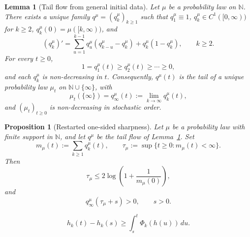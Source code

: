 \documentclass[10pt,a4paper]{amsart}
\newtheorem{lemma}{Lemma}
\newtheorem{proposition}{Proposition}
\newcommand{\N}{\mathbb N}
\begin{document}
\begin{lemma}[Tail flow from general initial data]
\label{lem:tail-flow-general-data}
Let $\mu$ be a probability law on $\N$. There exists a unique family
$q^\mu=(q_k^\mu)_{k\geq1}$ such that $q_1^\mu\equiv1$,
$q_k^\mu\in C^1([0,\infty))$ for $k\geq2$,
$q_k^\mu(0)=\mu([k,\infty))$, and
\begin{equation}
\label{eq:general-tail-flow}
        (q_k^\mu)'
        =
        \sum_{u=1}^{k-1}q_u^\mu
        (q_{k-u}^\mu-q_k^\mu)
        +q_k^\mu(1-q_k^\mu),
        \qquad k\geq2.
\end{equation}
For every $t\geq0$,
\[
        1=q_1^\mu(t)\geq q_2^\mu(t)\geq\cdots\geq0,
\]
and each $q_k^\mu$ is non-decreasing in $t$. Consequently,
$q^\mu(t)$ is the tail of a unique probability law $\mu_t$ on
$\N\cup\{\infty\}$, with
\[
        \mu_t(\{\infty\})
        =
        q_\infty^\mu(t)
        :=
        \lim_{k\to\infty}q_k^\mu(t),
\]
and $(\mu_t)_{t\geq0}$ is non-decreasing in stochastic order.
\end{lemma}

\begin{proposition}[Restarted one-sided sharpness]
\label{prop:restarted-one-sided}
Let $\mu$ be a probability law with finite support in $\N$, and let
$q^\mu$ be the tail flow of Lemma~\ref{lem:tail-flow-general-data}. Set
\[
        m_\mu(t):=\sum_{k\geq1}q_k^\mu(t),
        \qquad
        \tau_\mu:=\sup\{t\geq0:m_\mu(t)<\infty\}.
\]
Then
\begin{equation}
\label{eq:restarted-susceptibility-bound}
        \tau_\mu
        \leq
        2\log\left(1+\frac1{m_\mu(0)}\right),
\end{equation}
and
\begin{equation}
\label{eq:restarted-postcritical-explosion}
        q_\infty^\mu(\tau_\mu+s)>0,
        \qquad s>0.
\end{equation}
\end{proposition}

\begin{equation}
\label{eq:isotropic-endpoint-supersolution}
h_k(t)-h_k(s)
\geq
\int_s^t\Phi_k(h(u))\,du.
\end{equation}
\end{document}
